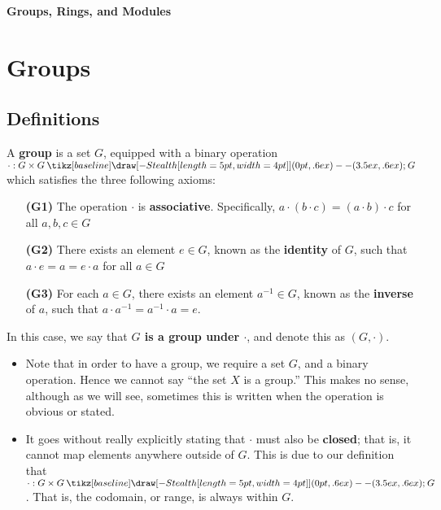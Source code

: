 \documentclass[12pt,letterpaper]{algebra_book}
\renewcommand{\to}{\mathbin{\tikz[baseline] \draw[-{Stealth[length=5pt,width=4pt]}] (0pt,.6ex) -- (3.5ex,.6ex);}}
\theoremstyle{definition}
\begin{document}
 
    \begin{center}
        {\huge \bf Groups, Rings, and Modules}
    \end{center}
    {\let\clearpage\relax 
    \tableofcontents
    \let\clearpage\relax}

    \chapter{Groups}

\section{Definitions}
\begin{definition}
A \textbf{group} is a set $G$, equipped with a binary operation
$\cdot : G \times G \to G$ which satisfies the three following axioms:

\begin{enumerate}
    \item[\textbf{(G1)}] The operation $\cdot$ is \textbf{associative}. Specifically, $a \cdot (b \cdot c) = (a \cdot b) \cdot c$ for all $a, b, c
    \in G$

    \item[\textbf{(G2)}] There exists an element $e \in G$, known as the
    \textbf{identity} of $G$, such that $a \cdot e = a = e \cdot a$
    for all $a \in G$ 

    \item[\textbf{(G3)}] For each $a \in G$, there exists an element $a^{-1} \in G$, 
    known as the \textbf{inverse} of $a$, such that $a \cdot a^{-1} =
    a^{-1} \cdot a = e$. 
\end{enumerate}
In this case, we say that \textbf{$G$ is a group under $\cdot$}, and denote
this  as $(G, \cdot)$.
\end{definition}

\begin{remark}
    \begin{itemize}
        \item Note that in order to have a group, we require a set $G$, and
        a binary operation. Hence we cannot say ``the set $X$ is a group.'' This
        makes no sense, although as we will see, sometimes this is written
        when the operation is obvious or stated.
    
        \item
        It goes without really explicitly stating that 
        $\cdot$ must also be \textbf{closed}; that is, it
        cannot map elements anywhere outside of $G$. This is due to our 
        definition that $\cdot : G \times G \to G$. That is, the
        codomain, or range, is always within $G$.
    \end{itemize}
\end{remark}
\end{document}
